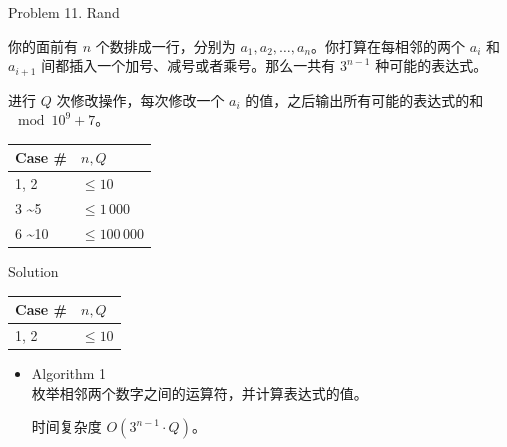 \documentclass[UTF8]{beamer}
\begin{document}

\begin{frame}{Problem 11. Rand}

你的面前有 $n$ 个数排成一行，分别为 $a_1, a_2, \dots, a_n$。你打算在每相邻的两个
$a_i$ 和 $a_{i+1}$ 间都插入一个加号、减号或者乘号。那么一共有 $3^{n-1}$ 种可能的表达式。

进行 $Q$ 次修改操作，每次修改一个 $a_i$ 的值，之后输出所有可能的表达式的和 $\mod 10^9 + 7$。

\begin{tabularx}{\textwidth}{X|X} \hline
Case \# & $n, Q$ \\ \hline \hline
1, 2                 & $\leq 10$       \\ \hline
3 \textasciitilde 5  & $\leq 1\,000$   \\ \hline
6 \textasciitilde 10 & $\leq 100\,000$ \\ \hline
\end{tabularx}

\end{frame}

\begin{frame}{Solution}

\begin{tabularx}{\textwidth}{X|X} \hline
Case \# & $n, Q$ \\ \hline \hline
1, 2                 & $\leq 10$       \\ \hline
\end{tabularx}
\begin{itemize}
    \item Algorithm 1 \\
        枚举相邻两个数字之间的运算符，并计算表达式的值。

        时间复杂度 $O(3^{n-1} \cdot Q)$。
\end{itemize}

\end{frame}
\end{document}
